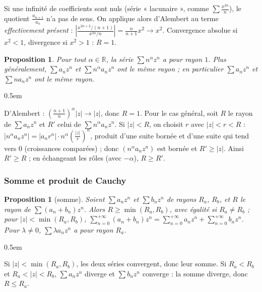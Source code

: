 \documentclass[a4paper,11pt]{article}
\makeatletter
\numberwithin{equation}{section}
\numberwithin{figure}{section}
\numberwithin{table}{section}
\theoremstyle{enonce}
\newtheorem{proposition}[definition]{Proposition}
\theoremstyle{exemple}
\theoremstyle{remarque}
\renewcommand{\proofname}{Démonstration}
\renewenvironment{proof}[1][\proofname]{\par\pushQED{\qed}\normalfont
  \topsep0.5em\relax\trivlist\item[\hskip\labelsep\sffamily\itshape\color{Gris}#1.]\ignorespaces}
  {\popQED\endtrivlist\@endpefalse}
\newcommand{\R}{\mathbb{R}}
\makeatother
\begin{document}
\begin{attention}
Si une infinité de coefficients sont nuls (série « lacunaire », comme $\sum\frac{x^{2n}}n$), le quotient $\frac{a_{n+1}}{a_n}$ n'a pas
de sens. On applique alors d'Alembert au terme \emph{effectivement présent} : $\left|\frac{x^{2n+2}/(n+1)}{x^{2n}/n}\right|=\frac n{n+1}x^2\to x^2$.
Convergence absolue si $x^2<1$, divergence si $x^2>1$ : $R=1$.
\end{attention}

\begin{proposition}\label{p:nalpha}
Pour tout $\alpha\in\R$, la série $\sum n^\alpha z^n$ a pour rayon $1$. Plus généralement, $\sum a_nz^n$ et $\sum n^\alpha a_nz^n$
ont le même rayon ; en particulier $\sum a_nz^n$ et $\sum na_nz^n$ ont le même rayon.
\end{proposition}

\begin{proof}
D'Alembert : $\left(\frac{n+1}n\right)^\alpha|z|\to|z|$, donc $R=1$. Pour le cas général, soit $R$ le rayon de $\sum a_nz^n$ et $R'$
celui de $\sum n^\alpha a_nz^n$. Si $|z|<R$, on choisit $r$ avec $|z|<r<R$ : $|n^\alpha a_nz^n|=|a_nr^n|\cdot n^\alpha\left(\frac{|z|}r\right)^n$,
produit d'une suite bornée et d'une suite qui tend vers $0$ (croissances comparées) ; donc $(n^\alpha a_nz^n)$ est bornée et
$R'\geq|z|$. Ainsi $R'\geq R$ ; en échangeant les rôles (avec $-\alpha$), $R\geq R'$.
\end{proof}

\subsubsection*{Somme et produit de Cauchy}

\begin{proposition}[somme]\label{p:somme}
Soient $\sum a_nz^n$ et $\sum b_nz^n$ de rayons $R_a$, $R_b$, et $R$ le rayon de $\sum(a_n+b_n)z^n$. Alors $R\geq\min(R_a,R_b)$,
avec égalité si $R_a\neq R_b$ ; pour $|z|<\min(R_a,R_b)$, $\sum_{n=0}^{+\infty}(a_n+b_n)z^n=\sum_{n=0}^{+\infty}a_nz^n+\sum_{n=0}^{+\infty}b_nz^n$.
Pour $\lambda\neq0$, $\sum\lambda a_nz^n$ a pour rayon $R_a$.
\end{proposition}

\begin{proof}
Si $|z|<\min(R_a,R_b)$, les deux séries convergent, donc leur somme. Si $R_a<R_b$ et $R_a<|z|<R_b$, $\sum a_nz^n$ diverge et
$\sum b_nz^n$ converge : la somme diverge, donc $R\leq R_a$.
\end{proof}
\end{document}
